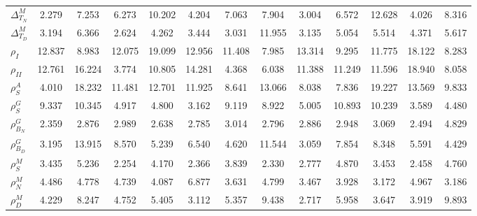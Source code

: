\begin{center}
\begin{longtable}{lcccccccccccc}
$ {\Delta^{M}_{T_N}}   $	 & 	       2.279	 & 	       7.253	 & 	       6.273	 & 	      10.202	 & 	       4.204	 & 	       7.063	 & 	       7.904	 & 	       3.004	 & 	       6.572	 & 	      12.628	 & 	       4.026	 & 	       8.316 \\ 
$ {\Delta^{M}_{T_D}}   $	 & 	       3.194	 & 	       6.366	 & 	       2.624	 & 	       4.262	 & 	       3.444	 & 	       3.031	 & 	      11.955	 & 	       3.135	 & 	       5.054	 & 	       5.514	 & 	       4.371	 & 	       5.617 \\ 
$ {\rho_{I}}           $	 & 	      12.837	 & 	       8.983	 & 	      12.075	 & 	      19.099	 & 	      12.956	 & 	      11.408	 & 	       7.985	 & 	      13.314	 & 	       9.295	 & 	      11.775	 & 	      18.122	 & 	       8.283 \\ 
$ {\rho_{II}}          $	 & 	      12.761	 & 	      16.224	 & 	       3.774	 & 	      10.805	 & 	      14.281	 & 	       4.368	 & 	       6.038	 & 	      11.388	 & 	      11.249	 & 	      11.596	 & 	      18.940	 & 	       8.058 \\ 
$ {\rho^{A}_{S}}       $	 & 	       4.010	 & 	      18.232	 & 	      11.481	 & 	      12.701	 & 	      11.925	 & 	       8.641	 & 	      13.066	 & 	       8.038	 & 	       7.836	 & 	      19.227	 & 	      13.569	 & 	       9.833 \\ 
$ {\rho^{G}_{S}}       $	 & 	       9.337	 & 	      10.345	 & 	       4.917	 & 	       4.800	 & 	       3.162	 & 	       9.119	 & 	       8.922	 & 	       5.005	 & 	      10.893	 & 	      10.239	 & 	       3.589	 & 	       4.480 \\ 
$ {\rho^{G}_{B_N}}     $	 & 	       2.359	 & 	       2.876	 & 	       2.989	 & 	       2.638	 & 	       2.785	 & 	       3.014	 & 	       2.796	 & 	       2.886	 & 	       2.948	 & 	       3.069	 & 	       2.494	 & 	       4.829 \\ 
$ {\rho^{G}_{B_D}}     $	 & 	       3.195	 & 	      13.915	 & 	       8.570	 & 	       5.239	 & 	       6.540	 & 	       4.620	 & 	      11.544	 & 	       3.059	 & 	       7.854	 & 	       8.348	 & 	       5.591	 & 	       4.429 \\ 
$ {\rho^{M}_{S}}       $	 & 	       3.435	 & 	       5.236	 & 	       2.254	 & 	       4.170	 & 	       2.366	 & 	       3.839	 & 	       2.330	 & 	       2.777	 & 	       4.870	 & 	       3.453	 & 	       2.458	 & 	       4.760 \\ 
$ {\rho^{M}_{N}}       $	 & 	       4.486	 & 	       4.778	 & 	       4.739	 & 	       4.087	 & 	       6.877	 & 	       3.631	 & 	       4.799	 & 	       3.467	 & 	       3.928	 & 	       3.172	 & 	       4.967	 & 	       3.186 \\ 
$ {\rho^{M}_{D}}       $	 & 	       4.229	 & 	       8.247	 & 	       4.752	 & 	       5.405	 & 	       3.112	 & 	       5.357	 & 	       9.438	 & 	       2.717	 & 	       5.958	 & 	       3.647	 & 	       3.919	 & 	       9.893 \\ 
\end{longtable}
 \end{center}
